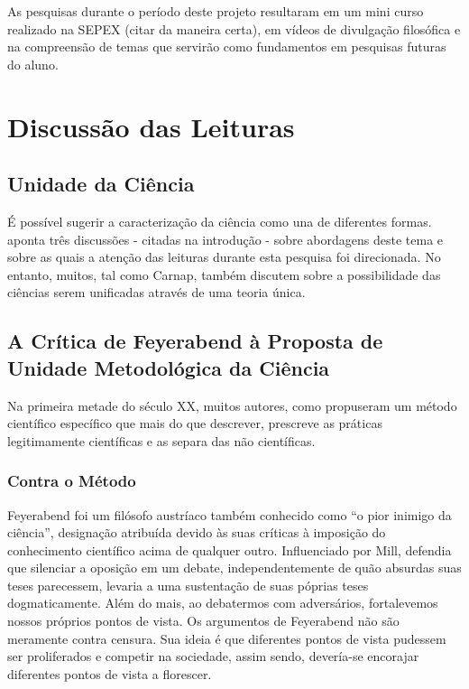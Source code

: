\documentclass[12pt]{report}
\begin{document}
	As pesquisas durante o período deste projeto resultaram em um mini curso realizado na SEPEX (citar da maneira certa), em vídeos de divulgação filosófica e na compreensão de temas que servirão como fundamentos em pesquisas futuras do aluno.
	
	\section{Discussão das Leituras}
	
	\subsection{Unidade da Ciência}
	
		É possível sugerir a caracterização da ciência como una de diferentes formas. \textcite{cunha-unidade} aponta três discussões - citadas na introdução - sobre abordagens deste tema e sobre as quais a atenção das leituras durante esta pesquisa foi direcionada. No entanto, muitos, tal como Carnap, também discutem sobre a possibilidade das ciências serem unificadas através de uma teoria única.
		
	\subsection{A Crítica de Feyerabend à Proposta de Unidade Metodológica da Ciência}
		
		Na primeira metade do século XX, muitos autores, como \textcite{popper_conjeturas} propuseram um método científico específico que mais do que descrever, prescreve as práticas legitimamente científicas e as separa das não científicas.
		
		\subsubsection{Contra o Método}
			
			Feyerabend foi um filósofo austríaco também conhecido como ``o pior inimigo da ciência'', designação atribuída devido às suas críticas à imposição do conhecimento científico acima de qualquer outro. Influenciado por Mill, defendia que silenciar a oposição em um debate, independentemente de quão absurdas suas teses parecessem, levaria a uma sustentação de suas póprias teses dogmaticamente. Além do mais, ao debatermos com adversários, fortalevemos nossos próprios pontos de vista. Os argumentos de Feyerabend não são meramente contra censura. Sua ideia é que diferentes pontos de vista pudessem ser proliferados e competir na sociedade, assim sendo, devería-se encorajar diferentes pontos de vista a florescer.
			
\end{document}
